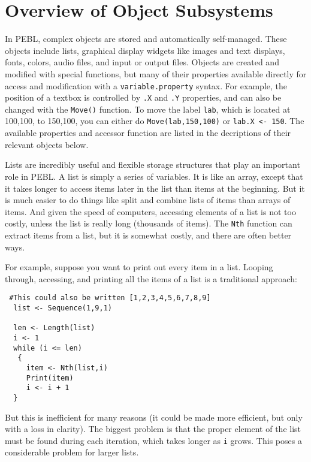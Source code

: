 
\chapter
{Overview of Object Subsystems}

In PEBL, complex objects are stored and automatically self-managed.
These objects include lists, graphical display widgets like images and
text displays, fonts, colors, audio files, and input or output files.
Objects are created and modified with special functions, but many of
their properties available directly for access and modification with a
\texttt{variable.property} syntax.  For example, the position of a
textbox is controlled by \verb+.X+ and \verb+.Y+ properties, and can
also be changed with the \verb+Move()+ function.  To move the label
\texttt{lab}, which is located at 100,100, to 150,100, you can either
do \texttt{Move(lab,150,100)} or \verb+lab.X <- 150+.  The available
properties and accessor function are listed in the decriptions of
their relevant objects below.



Lists are incredibly useful and flexible storage structures that play
an important role in PEBL. A list is simply a series of variables. It
is like an array, except that it takes longer to access items later in
the list than items at the beginning. But it is much easier to do
things like split and combine lists of items than arrays of items. And
given the speed of computers, accessing elements of a list is not too
costly, unless the list is really long (thousands of items). The
\texttt{Nth} function can extract items from a list, but it is
somewhat costly, and there are often better ways.

\newpage
For example, suppose you want to print out every item in a list. Looping through, accessing, and printing all the items of a list is a traditional approach:
\begin{verbatim}
 #This could also be written [1,2,3,4,5,6,7,8,9]
  list <- Sequence(1,9,1) 

  len <- Length(list)
  i <- 1
  while (i <= len)
   {
     item <- Nth(list,i) 
     Print(item)
     i <- i + 1
  } 

\end{verbatim}
But this is inefficient for many reasons (it could be made more
efficient, but only with a loss in clarity). The biggest problem is
that the proper element of the list must be found during each
iteration, which takes longer as \texttt{i} grows. This poses a
considerable problem for larger lists.


